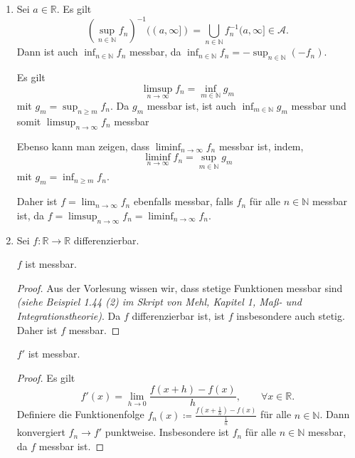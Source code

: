 \documentclass[a4paper]{article}
\begin{document}
\begin{enumerate}[label=(\roman*)]
\item Sei $a \in \mathbb R$. Es gilt
\[
	(\sup_{n \in \mathbb N} f_n)^{-1}((a,\infty]) = \bigcup_{n \in \mathbb N} f_n^{-1}(a,\infty] \in \mathcal A.
\]
Dann ist auch $\inf_{n \in \mathbb N} f_n$ messbar, da $\inf_{n \in \mathbb N} f_n = - \sup_{n \in \mathbb N}(-f_n)$.

Es gilt $$\limsup_{n \to \infty} f_n = \inf_{m \in \mathbb N} g_m$$ mit $g_m = \sup_{n \geq m}f_n$. Da $g_m$ messbar ist, ist auch $\inf_{m \in \mathbb N} g_m$ messbar und somit $\limsup_{n \to \infty} f_n$ messbar

Ebenso kann man zeigen, dass $\liminf_{n \to \infty} f_n$ messbar ist, indem,
\[
	\liminf_{n \to \infty} f_n = \sup_{m \in \mathbb N}g_m
\]
mit $g_m = \inf_{n \geq m}f_n$. 

Daher ist $f = \lim_{n \to \infty}f_n$ ebenfalls messbar, falls $f_n$ für alle $n \in \mathbb N$ messbar ist, da $f = \limsup_{n \to \infty}f_n = \liminf_{n \to \infty}f_n$.


\item Sei $f: \mathbb R \to \mathbb R$ differenzierbar. 
\begin{issue}{}{}
$f$ ist messbar.
\end{issue}
\begin{proof}
Aus der Vorlesung wissen wir, dass stetige Funktionen messbar sind \emph{(siehe Beispiel 1.44 (2) im Skript von Mehl, Kapitel 1, Maß- und Integrationstheorie)}. Da $f$ differenzierbar ist, ist $f$ insbesondere auch stetig. Daher ist $f$ messbar.
\end{proof}

\begin{issue}{}{}
$f'$ ist messbar.
\end{issue}
\begin{proof}
Es gilt
\[
	f'(x) = \lim_{h \to 0} \frac{f(x+h) - f(x)}{h}, \qquad \forall x \in \mathbb R.
\]
Definiere die Funktionenfolge $f_n(x) \coloneqq \frac{f(x+\frac{1}{n}) - f(x)}{\frac{1}{n}}$ für alle $n \in \mathbb N$. Dann konvergiert $f_n \to f'$ punktweise. Insbesondere ist $f_n$ für alle $n \in \mathbb N$ messbar, da $f$ messbar ist.
\end{proof}
\end{enumerate}
\end{document}
